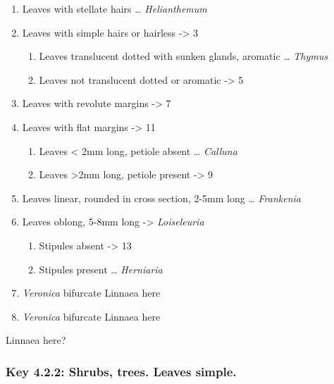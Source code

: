 \documentclass[openany]{book}
\providecommand{\tightlist}{%
  \setlength{\itemsep}{0pt}\setlength{\parskip}{0pt}}
\begin{document}
\begin{enumerate}
\def\labelenumi{\arabic{enumi}.}
\tightlist
\item
  Leaves with stellate hairs \ldots{} \emph{Helianthemum}
\item
  Leaves with simple hairs or hairless -\textgreater{} 3

  \begin{enumerate}
  \def\labelenumii{\arabic{enumii}.}
  \setcounter{enumii}{2}
  \tightlist
  \item
    Leaves translucent dotted with sunken glands, aromatic \ldots{}
    \emph{Thymus}
  \item
    Leaves not translucent dotted or aromatic -\textgreater{} 5
  \end{enumerate}
\item
  Leaves with revolute margins -\textgreater{} 7
\item
  Leaves with flat margins -\textgreater{} 11

  \begin{enumerate}
  \def\labelenumii{\arabic{enumii}.}
  \setcounter{enumii}{6}
  \tightlist
  \item
    Leaves \textless{} 2mm long, petiole absent \ldots{} \emph{Calluna}
  \item
    Leaves \textgreater{}2mm long, petiole present -\textgreater{} 9
  \end{enumerate}
\item
  Leaves linear, rounded in cross section, 2-5mm long \ldots{}
  \emph{Frankenia}
\item
  Leaves oblong, 5-8mm long -\textgreater{} \emph{Loiseleuria}

  \begin{enumerate}
  \def\labelenumii{\arabic{enumii}.}
  \setcounter{enumii}{10}
  \tightlist
  \item
    Stipules absent -\textgreater{} 13
  \item
    Stipules present \ldots{} \emph{Herniaria}
  \end{enumerate}
\item
  \emph{Veronica} bifurcate Linnaea here
\item
  \emph{Veronica} bifurcate Linnaea here
\end{enumerate}

Linnaea here?

\hypertarget{key-4.2.2-shrubs-trees.-leaves-simple.}{%
\subsubsection{Key 4.2.2: Shrubs, trees. Leaves
simple.}\label{key-4.2.2-shrubs-trees.-leaves-simple.}}
\end{document}
